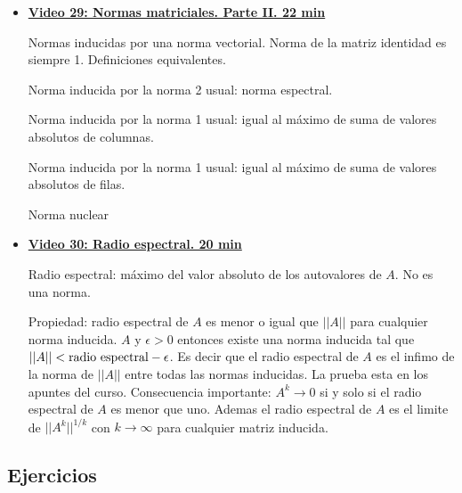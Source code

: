 \documentclass[12pt,a4paper]{article}
\newcommand\1{\mbox{\,\vrule height-0.8pt depth1.0pt width2pc\,}}
\newcommand\2{\mbox{\,\vrule height-0.8pt depth1.0pt width1pc\,}}
\begin{document}
\begin{itemize}
        La norma medica. No es una norma matricial. 
        
        Normas inducidas por una norma vectorial. Definici\'on: $|||A|||=\max_{x\not=0} \frac{||A x||}{||x||}$ donde para $A $ matriz de $n \times n$ consideramos $||.||$ es cualquier norma en $R^n$. Prueba de que todas esas normas son normas matriciales. 
       
         \item      \href{https://youtu.be/dwA38Q51jPU}{\bf Video 29: Normas matriciales. Parte II. 22 min} 
       
       
       Normas inducidas por una norma vectorial. Norma de la matriz identidad es siempre 1. Definiciones equivalentes. 
       
       Norma inducida por la norma 2 usual: norma espectral.
       
       Norma inducida por la norma 1 usual: igual al m\'aximo de suma de valores absolutos de columnas. 
       
       Norma inducida por la norma 1 usual: igual al m\'aximo de suma de valores absolutos de filas. 
       
       Norma nuclear

  \item      \href{https://youtu.be/aXsRmXH2vqE}{\bf Video 30: Radio espectral. 20 min} 
  
  Radio espectral: m\'aximo del valor absoluto de los autovalores de $A$. No es una norma.
  
  Propiedad: radio espectral de $A$ es menor o igual que $||A||$ para cualquier norma inducida.
  $A$ y $\epsilon >0$ entonces existe una norma inducida tal que $||A||< \hbox{radio espectral} -\epsilon$. Es decir que el radio espectral de $A$ es el infimo de la norma de $||A||$ entre todas las normas inducidas.
  La prueba esta en los apuntes del curso. Consecuencia importante: $A^k \rightarrow 0$
si y solo si el radio espectral de $A$
es menor que uno. Ademas el radio espectral de $A$ es el limite de $||A^k||^{1/k}$ con $k\rightarrow \infty$ para cualquier matriz inducida. 
\end{itemize}

\subsection*{Ejercicios}
\end{document}
